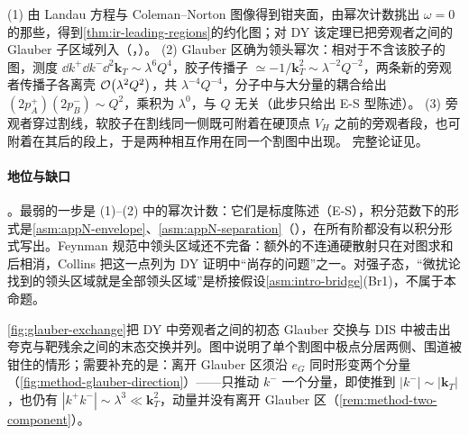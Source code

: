 \begin{proofsketch}
(1) 由 Landau 方程与 Coleman--Norton 图像得到钳夹面，由幂次计数挑出 $\omega=0$ 的那些，得到\cref{thm:ir-leading-regions}的约化图；对 DY 该定理已把旁观者之间的 Glauber 子区域列入（\cite[第~5.8--5.11~节]{Collins2011}，\cite[第~8.7~节]{CollinsSoperSterman1989}）。
(2) Glauber 区确为领头幂次：相对于不含该胶子的图，测度 $\dd k^+\dd k^-\dd^2\mathbf k_T\sim\lambda^6Q^4$，胶子传播子 $\simeq-1/\mathbf k_T^2\sim\lambda^{-2}Q^{-2}$，两条新的旁观者传播子各离壳 $\mathcal{O}\!\left(\lambda^2Q^2\right)$，共 $\lambda^{-4}Q^{-4}$，分子中与大分量的耦合给出 $(2p_A^+)(2p_B^-)\sim Q^2$，乘积为 $\lambda^0$，与 $Q$ 无关\cite[第~5.6.2~节]{Collins2011}（此步只给出 E-S 型陈述）。
(3) 旁观者穿过割线，软胶子在割线同一侧既可附着在硬顶点 $V_H$ 之前的旁观者段，也可附着在其后的段上，于是两种相互作用在同一个割图中出现。
完整论证见\cite[第~5~章与第~14.3~节]{Collins2011}。
\end{proofsketch}

\paragraph{地位与缺口}\tagA。最弱的一步是 (1)–(2) 中的幂次计数：它们是标度陈述（E-S），积分范数下的形式是\cref{asm:appN-envelope}、\cref{asm:appN-separation}（\tagA），在所有阶都没有以积分形式写出。Feynman 规范中领头区域还不完备：额外的不连通硬散射只在对图求和后相消\cite{Labastida:1984gy}，Collins 把这一点列为 DY 证明中“尚存的问题”之一\cite[第~14.4.8~节]{Collins2011}。对强子态，“微扰论找到的领头区域就是全部领头区域”是桥接假设\cref{asm:intro-bridge}(Br1)，不属于本命题。

\cref{fig:glauber-exchange}把 DY 中旁观者之间的初态 Glauber 交换与 DIS 中被击出夸克与靶残余之间的末态交换并列。图中说明了单个割图中极点分居两侧、围道被钳住的情形；需要补充的是：离开 Glauber 区须沿 $e_G$ 同时形变两个分量（\cref{fig:method-glauber-direction}）——只推动 $k^-$ 一个分量，即使推到 $|k^-|\sim|\mathbf k_T|$，也仍有 $|k^+k^-|\sim\lambda^3\ll\mathbf k_T^2$，动量并没有离开 Glauber 区（\cref{rem:method-two-component}）。

